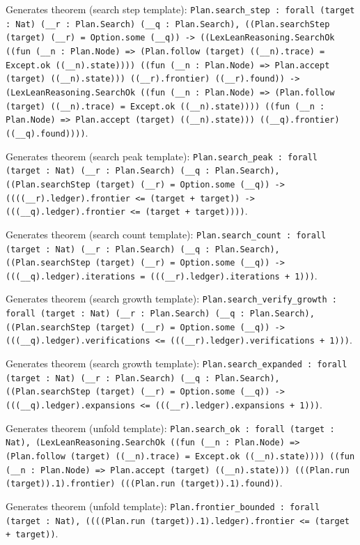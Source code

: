 \documentclass[11pt]{article}
\begin{document}
\noindent Generates theorem (search step template): \texttt{Plan.search\_step : forall (target : Nat) (\_\_r : Plan.Search) (\_\_q : Plan.Search), ((Plan.searchStep (target) (\_\_r) = Option.some (\_\_q)) -> ((LexLeanReasoning.SearchOk ((fun (\_\_n : Plan.Node) => (Plan.follow (target) ((\_\_n).trace) = Except.ok ((\_\_n).state)))) ((fun (\_\_n : Plan.Node) => Plan.accept (target) ((\_\_n).state))) ((\_\_r).frontier) ((\_\_r).found)) -> (LexLeanReasoning.SearchOk ((fun (\_\_n : Plan.Node) => (Plan.follow (target) ((\_\_n).trace) = Except.ok ((\_\_n).state)))) ((fun (\_\_n : Plan.Node) => Plan.accept (target) ((\_\_n).state))) ((\_\_q).frontier) ((\_\_q).found))))}.\par
\noindent Generates theorem (search peak template): \texttt{Plan.search\_peak : forall (target : Nat) (\_\_r : Plan.Search) (\_\_q : Plan.Search), ((Plan.searchStep (target) (\_\_r) = Option.some (\_\_q)) -> ((((\_\_r).ledger).frontier <= (target + target)) -> (((\_\_q).ledger).frontier <= (target + target))))}.\par
\noindent Generates theorem (search count template): \texttt{Plan.search\_count : forall (target : Nat) (\_\_r : Plan.Search) (\_\_q : Plan.Search), ((Plan.searchStep (target) (\_\_r) = Option.some (\_\_q)) -> (((\_\_q).ledger).iterations = (((\_\_r).ledger).iterations + 1)))}.\par
\noindent Generates theorem (search growth template): \texttt{Plan.search\_verify\_growth : forall (target : Nat) (\_\_r : Plan.Search) (\_\_q : Plan.Search), ((Plan.searchStep (target) (\_\_r) = Option.some (\_\_q)) -> (((\_\_q).ledger).verifications <= (((\_\_r).ledger).verifications + 1)))}.\par
\noindent Generates theorem (search growth template): \texttt{Plan.search\_expanded : forall (target : Nat) (\_\_r : Plan.Search) (\_\_q : Plan.Search), ((Plan.searchStep (target) (\_\_r) = Option.some (\_\_q)) -> (((\_\_q).ledger).expansions <= (((\_\_r).ledger).expansions + 1)))}.\par
\noindent Generates theorem (unfold template): \texttt{Plan.search\_ok : forall (target : Nat), (LexLeanReasoning.SearchOk ((fun (\_\_n : Plan.Node) => (Plan.follow (target) ((\_\_n).trace) = Except.ok ((\_\_n).state)))) ((fun (\_\_n : Plan.Node) => Plan.accept (target) ((\_\_n).state))) (((Plan.run (target)).1).frontier) (((Plan.run (target)).1).found))}.\par
\noindent Generates theorem (unfold template): \texttt{Plan.frontier\_bounded : forall (target : Nat), ((((Plan.run (target)).1).ledger).frontier <= (target + target))}.\par
\end{document}
